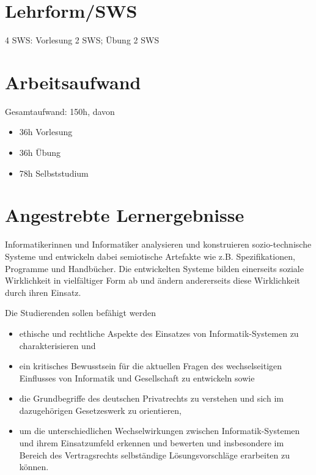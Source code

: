 \hypertarget{lehrformswspathlabelmi-2017modulbeschreibungen-bachelorba_mug}{%
\section*{Lehrform/SWS\label{/mi-2017/modulbeschreibungen-bachelor/BA_MUG}}\label{lehrformswspathlabelmi-2017modulbeschreibungen-bachelorba_mug}}

4 SWS: Vorlesung 2 SWS; Übung 2 SWS

\hypertarget{arbeitsaufwandpathlabelmi-2017modulbeschreibungen-bachelorba_mug}{%
\section*{Arbeitsaufwand\label{/mi-2017/modulbeschreibungen-bachelor/BA_MUG}}\label{arbeitsaufwandpathlabelmi-2017modulbeschreibungen-bachelorba_mug}}

Gesamtaufwand: 150h, davon

\begin{itemize}
\tightlist
\item
  36h Vorlesung
\item
  36h Übung
\item
  78h Selbststudium
\end{itemize}

\hypertarget{angestrebte-lernergebnissepathlabelmi-2017modulbeschreibungen-bachelorba_mug}{%
\section*{Angestrebte
Lernergebnisse\label{/mi-2017/modulbeschreibungen-bachelor/BA_MUG}}\label{angestrebte-lernergebnissepathlabelmi-2017modulbeschreibungen-bachelorba_mug}}

Informatikerinnen und Informatiker analysieren und konstruieren
sozio-technische Systeme und entwickeln dabei semiotische Artefakte wie
z.B. Spezifikationen, Programme und Handbücher. Die entwickelten Systeme
bilden einerseits soziale Wirklichkeit in vielfältiger Form ab und
ändern andererseits diese Wirklichkeit durch ihren Einsatz.

Die Studierenden sollen befähigt werden

\begin{itemize}
\tightlist
\item
  ethische und rechtliche Aspekte des Einsatzes von Informatik-Systemen
  zu charakterisieren und
\item
  ein kritisches Bewusstsein für die aktuellen Fragen des
  wechselseitigen Einflusses von Informatik und Gesellschaft zu
  entwickeln sowie
\item
  die Grundbegriffe des deutschen Privatrechts zu verstehen und sich im
  dazugehörigen Gesetzeswerk zu orientieren,
\item
  um die unterschiedlichen Wechselwirkungen zwischen Informatik-Systemen
  und ihrem Einsatzumfeld erkennen und bewerten und insbesondere im
  Bereich des Vertragsrechts selbständige Lösungsvorschläge erarbeiten
  zu können.
\end{itemize}

